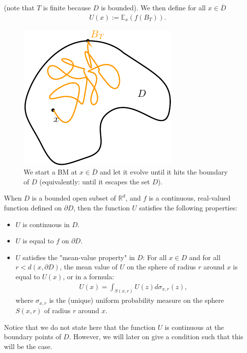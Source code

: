 \documentclass[../mainfile.tex]{subfiles}
\begin{document}
(note that $T$ is finite because $D$ is bounded). We then define for all $x \in \overline{D}$ 
\begin{align*}
U(x):= \mathbb{E}_x (f ( B_T)). 
\end{align*}
\begin{figure}[hbtp]
\centering
\includegraphics[scale=.9]{funcU.pdf}
\caption{We start a BM at $x \in \overline{D}$ and let it evolve until it hits the boundary of $D$ (equivalently: until it escapes the set $D$).}
\end{figure}
\begin{prop} \label{propfuncU} When $D$ is a bounded open subset of $\mathbb{R}^d$, and $f$ is a continuous, real-valued function defined on $\partial D$, then the function $U$ satisfies the following properties:
\begin{itemize}
\item $U$ is continuous in $D$.
\item $U$ is equal to $f$ on $\partial D$.
\item $U$ satisfies the "mean-value property" in $D$: For all $x \in D$ and for all \\ $r<d(x, \partial D)$, the mean value of $U$ on the sphere of radius $r$ around $x$ is equal to $U(x)$, or in a formula:
\begin{align*}
U(x)= \int_{S(x,r)} U(z)d \sigma_{x,r}(z),
\end{align*}
where $\sigma_{x,r}$ is the (unique) uniform probability measure on the sphere $S(x,r)$ of radius $r$ around $x$. 
\end{itemize}
\end{prop}
\newpage
\begin{rem} Notice that we do not state here that the function $U$ is continuous at the boundary points of $D$. However, we will later on give a condition such that this will be the case. 
\end{rem}
\end{document}
